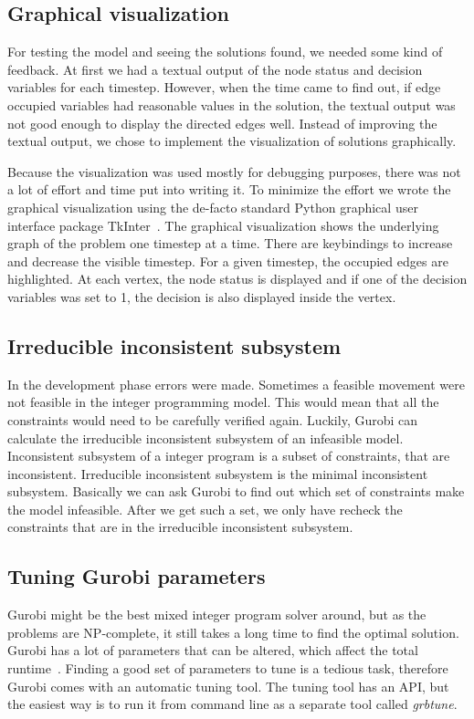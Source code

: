 \subsection{Graphical visualization}
For testing the model and seeing the solutions found, we needed some kind of
feedback. At first we had a textual output of the node status and decision
variables for each timestep.
However, when the time came to find out, if edge occupied variables had
reasonable values in the solution, the textual output was not good enough to
display the directed edges well. Instead of improving the textual output, we
chose to implement the visualization of solutions graphically.

Because the visualization was used mostly for debugging purposes, there was not
a lot of effort and time put into writing it. To minimize the effort we wrote
the graphical visualization using the de-facto standard Python graphical user
interface package TkInter~\cite{tkinter}. The graphical visualization shows the
underlying graph of the problem one timestep at a time. There are keybindings
to increase and decrease the visible timestep. For a given timestep, the
occupied edges are highlighted. At each vertex, the node status is displayed
and if one of the decision variables was set to 1, the decision is also displayed
inside the vertex.
\subsection{Irreducible inconsistent subsystem}
In the development phase errors were made. Sometimes a feasible movement were
not feasible in the integer programming model. This would mean that all the
constraints would need to be carefully verified again. Luckily, Gurobi can
calculate the irreducible inconsistent subsystem of an infeasible model.
Inconsistent subsystem of a integer program is a subset of constraints, that
are inconsistent. Irreducible inconsistent subsystem is the minimal
inconsistent subsystem. Basically we can ask Gurobi to find out which set of
constraints make the model infeasible. After we get such a set, we only have
recheck the constraints that are in the irreducible inconsistent subsystem.
\subsection{Tuning Gurobi parameters}
Gurobi might be the best mixed integer program solver around, but as the
problems are NP-complete, it still takes a long time to find the optimal
solution. Gurobi has a lot of parameters that can be altered, which affect the
total runtime~\cite{gurobiparams}. Finding a good set of parameters to tune is
a tedious task, therefore Gurobi comes with an automatic tuning tool. The
tuning tool has an API, but the easiest way is to run it from command line as a
separate tool called \textit{grbtune}.

